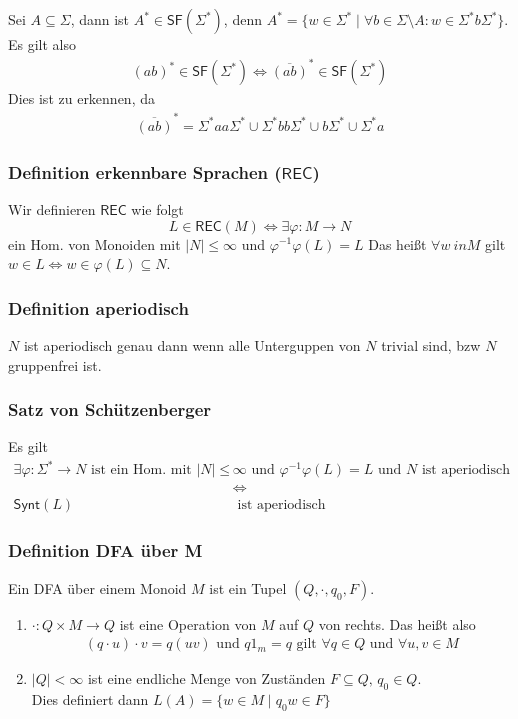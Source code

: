 \documentclass[12pt, german]{article}
\newcommand{\sigstern}{\Sigma^\ast}
\newcommand{\inv}{^{-1}}
\newcommand{\rec}{\mathsf{REC}}
\newcommand{\starfree}{\mathsf{SF}}
\newcommand{\synt}{\mathsf{Synt}}
\begin{document}
	Sei $A\subseteq \Sigma$, dann ist $A^\ast \in \starfree(\sigstern)$, denn $A^\ast = \{ w \in \sigstern \mid \forall b \in \Sigma \setminus A : w \in \sigstern b\sigstern\}$. Es gilt also 
	\begin{align*}
		(ab)^\ast \in \starfree(\sigstern) \iff \overline{(ab)}^\ast\in \starfree(\sigstern)
	\end{align*}
	Dies ist zu erkennen, da  
	\begin{align*}
		\overline{(ab)}^\ast = \sigstern aa \sigstern \cup \sigstern bb \sigstern \cup b\sigstern \cup \sigstern a
	\end{align*}
	
	
	
	\subsubsection{Definition erkennbare Sprachen ($\rec$)}
	Wir definieren $\rec$ wie folgt  $$L \in \rec(M) \iff \exists \varphi : M \to N$$ ein Hom. von Monoiden mit $|N| \leq \infty$ und $\varphi\inv\varphi(L) = L$
	Das heißt $\forall w \ in M$ gilt $w\in L \iff w \in \varphi(L) \subseteq N$.
	
	\subsubsection{Definition aperiodisch}
	$N$ ist aperiodisch genau dann wenn alle Unterguppen von $N$ trivial sind, bzw $N$ gruppenfrei ist.
	
	
	\subsubsection{Satz von Schützenberger}
	Es gilt 
	\begin{align*}
		\exists \varphi: \sigstern \to N \text{ ist ein Hom. mit } |N| \leq &\infty \text{ und } \varphi\inv\varphi(L) = L \text{ und $N$ ist aperiodisch} \\ 
		&\iff \\
		\synt(L) &\text{ ist aperiodisch}
	\end{align*}
	
	\subsubsection{Definition DFA über M}
	Ein DFA über einem Monoid $M$ ist ein Tupel $(Q, \cdot, q_0, F)$. 
	\begin{enumerate}[label=\arabic*)]
		\item $\cdot: Q \times M \to Q$ ist eine Operation von $M$ auf $Q$ von rechts. Das heißt also
		\begin{align*}
			(q \cdot u) \cdot v = q(uv) \text{ und } q1_m = q \text{ gilt } \forall q \in Q \text{ und } \forall u,v \in M
		\end{align*}
		\item $|Q| < \infty$ ist eine endliche Menge von Zuständen $F\subseteq Q,  \, q_0 \in Q$. \\
		Dies definiert dann $L(A) = \{w \in M \mid q_0w \in F\}$
	\end{enumerate}
	
\end{document}
